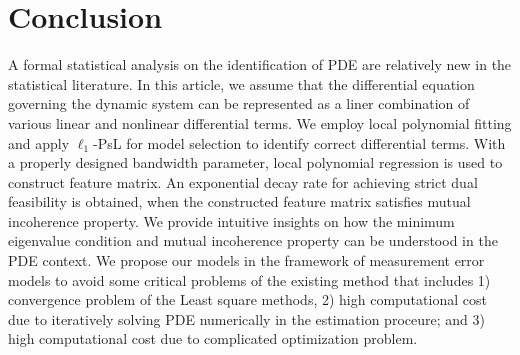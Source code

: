 \documentclass[a4paper,11pt]{article}
\theoremstyle{definition}
\begin{document}
\section{Conclusion} \label{sec:con}
A formal statistical analysis on the identification of PDE are relatively new in the statistical literature. In this article, we assume that the differential equation governing the dynamic system can be represented as a liner combination of various linear and nonlinear differential terms.  We employ local polynomial fitting and apply $\ell_{1}$-PsL for model selection to identify correct differential terms.  With a properly designed bandwidth parameter, local polynomial regression is used to construct feature matrix.   An exponential decay rate for achieving strict dual feasibility is obtained, when the constructed feature matrix satisfies mutual incoherence property.  We provide intuitive insights on how the minimum eigenvalue condition and mutual incoherence property can be understood in the PDE context.
%
We propose our models in the framework of measurement error models to avoid some critical problems of the existing method that includes
1) convergence problem of the Least square methods,
2) high computational cost due to iteratively solving PDE numerically in the estimation proceure; and
3) high computational cost due to complicated optimization problem.
\end{document}
